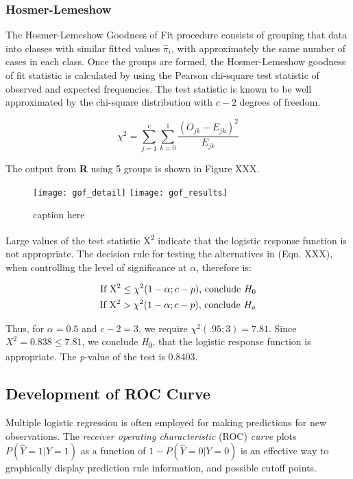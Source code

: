 \subsubsection{Hosmer-Lemeshow}
The Hosmer-Lemeshow Goodness of Fit procedure consists of grouping that data into classes with similar fitted values \(\hat{\pi}_i\), with approximately the same number of cases in each class. Once the groups are formed, the Hosmer-Lemeshow goodness of fit statistic is calculated by using the Pearson chi-square test statistic of observed and expected frequencies. The test statistic is known to be well approximated by the chi-square distribution with \(c-2\) degrees of freedom.

\begin{equation}
	\chi^2 = \sum_{j=1}^{c} \sum_{k=0}^{1} \frac{(O_{jk}-E_{jk})^2}{E_{jk}}
\end{equation}

The output from \textbf{R} using 5 groups is shown in Figure XXX.

\begin{figure}[H]
	\centering
	\texttt{[image: gof\_detail]}
	\texttt{[image: gof\_results]}
	\caption{caption here}
\end{figure}

Large values of the test statistic X\textsuperscript{2} indicate that the logistic response function is not appropriate. The decision rule for testing the alternatives in (Eqn. XXX), when controlling the level of significance at \(\alpha\), therefore is:

\begin{align}
\begin{split}
	\textrm{If X\textsuperscript{2}} \leq \chi^2(1-\alpha; c-p)\textrm{, conclude } H_0 \\
	\textrm{If X\textsuperscript{2}} > \chi^2(1-\alpha; c-p)\textrm{, conclude } H_a
\end{split}
\end{align}

Thus, for \(\alpha=0.5\) and \(c-2=3\), we require \(\chi^2(.95; 3)=7.81\). Since \(X^2=0.838\leq7.81\), we conclude \textit{H}\textsubscript{0}, that the logistic response function is appropriate. The \textit{p}-value of the test is 0.8403.

\subsection{Development of ROC Curve}
Multiple logistic regression is often employed for making predictions for new observations.
The \textit{receiver operating characteristic} (ROC) \textit{curve} plots \(P(\hat{Y}=1 | Y=1)\) as a function of \(1-P(\hat{Y}=0 | Y=0)\) is an effective way to graphically display prediction rule information, and possible cutoff points. \par

